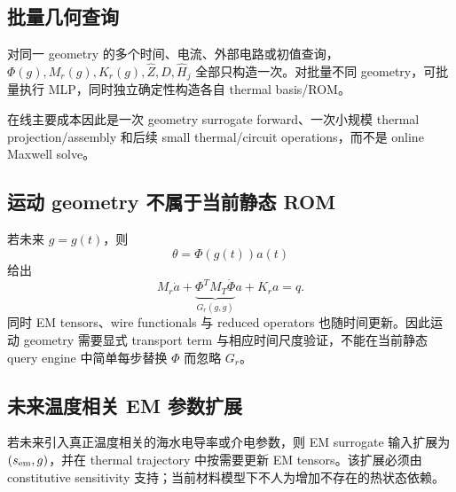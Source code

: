 \subsection{批量几何查询}
对同一 geometry 的多个时间、电流、外部电路或初值查询，$\Phi(g),M_r(g),K_r(g),\widehat Z,\widehat D,\widehat H_j$ 全部只构造一次。对批量不同 geometry，可批量执行 MLP，同时独立确定性构造各自 thermal basis/ROM。

在线主要成本因此是一次 geometry surrogate forward、一次小规模 thermal projection/assembly 和后续 small thermal/circuit operations，而不是 online Maxwell solve。

\subsection{运动 geometry 不属于当前静态 ROM}
若未来 $g=g(t)$，则
\begin{equation}
\theta=\Phi(g(t))a(t)
\end{equation}
给出
\begin{equation}
M_r\dot a
+\underbrace{\Phi^TM_T\dot\Phi}_{G_r(g,\dot g)}a
+K_ra=q.
\end{equation}
同时 EM tensors、wire functionals 与 reduced operators 也随时间更新。因此运动 geometry 需要显式 transport term 与相应时间尺度验证，不能在当前静态 query engine 中简单每步替换 $\Phi$ 而忽略 $G_r$。

\subsection{未来温度相关 EM 参数扩展}
若未来引入真正温度相关的海水电导率或介电参数，则 EM surrogate 输入扩展为 $(s_{\rm em},g)$，并在 thermal trajectory 中按需要更新 EM tensors。该扩展必须由 constitutive sensitivity 支持；当前材料模型下不人为增加不存在的热状态依赖。
